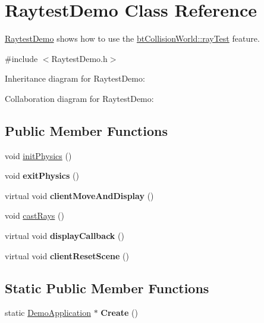 \hypertarget{class_raytest_demo}{\section{Raytest\+Demo Class Reference}
\label{class_raytest_demo}
}


\hyperlink{class_raytest_demo}{Raytest\+Demo} shows how to use the \hyperlink{classbt_collision_world_aaac6675c8134f6695fecb431c72b0a6a}{bt\+Collision\+World\+::ray\+Test} feature.  




{\ttfamily \#include $<$Raytest\+Demo.\+h$>$}



Inheritance diagram for Raytest\+Demo\+:


Collaboration diagram for Raytest\+Demo\+:
\subsection*{Public Member Functions}
\begin{DoxyCompactItemize}
\item 
void \hyperlink{class_raytest_demo_a23157feb605bdf20dfeca2fbeb68252e}{init\+Physics} ()
\item 
\hypertarget{class_raytest_demo_a4886762f94fb47798eba81a801a7d287}{void {\bfseries exit\+Physics} ()}\label{class_raytest_demo_a4886762f94fb47798eba81a801a7d287}

\item 
\hypertarget{class_raytest_demo_a52e5d1505cd4f70ed50a3ed5be4d85de}{virtual void {\bfseries client\+Move\+And\+Display} ()}\label{class_raytest_demo_a52e5d1505cd4f70ed50a3ed5be4d85de}

\item 
void \hyperlink{class_raytest_demo_a563e071e8fa426ac41f4939be6141205}{cast\+Rays} ()
\item 
\hypertarget{class_raytest_demo_a4cc43c0e7a10406eddbf5284b726bec1}{virtual void {\bfseries display\+Callback} ()}\label{class_raytest_demo_a4cc43c0e7a10406eddbf5284b726bec1}

\item 
\hypertarget{class_raytest_demo_a8cfaa5f126aac8329b8352376f509c0c}{virtual void {\bfseries client\+Reset\+Scene} ()}\label{class_raytest_demo_a8cfaa5f126aac8329b8352376f509c0c}

\end{DoxyCompactItemize}
\subsection*{Static Public Member Functions}
\begin{DoxyCompactItemize}
\item 
\hypertarget{class_raytest_demo_a4ed3c16af68b34320684dba76644bd14}{static \hyperlink{class_demo_application}{Demo\+Application} $\ast$ {\bfseries Create} ()}\label{class_raytest_demo_a4ed3c16af68b34320684dba76644bd14}

\end{DoxyCompactItemize}


